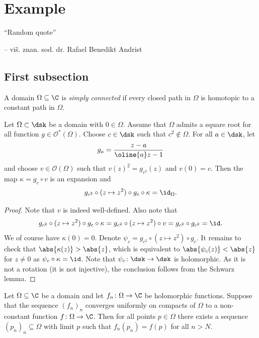 
\section{Example}

\epigraph{``Random quote''}{-- viš. znan. sod. dr. Rafael
Benedikt Andrist}

\subsection{First subsection}


\begin{definicija}
A domain $\Omega \subseteq \C$ is
\emph{simply connected} if every closed
path in $\Omega$ is homotopic to a constant path in $\Omega$.
\end{definicija}



\begin{lema}
Let $\Omega \subset \dsk$ be a domain with $0 \in \Omega$. Assume
that $\Omega$ admits a square root for all function
$g \in \mathcal{O}^*(\Omega)$. Choose $c \in \dsk$ such that
$c^2 \not \in \Omega$. For all $a \in \dsk$, let
\[
g_a = \frac{z - a}{\oline{a} z - 1}
\]
and choose $v \in \mathcal{O}(\Omega)$ such that
$v(z)^2 = g_{c^2}(z)$ and $v(0) = c$. Then the map
$\kappa = g_c \circ v$ is an expansion and
\[
g_{c^2} \circ (z \mapsto z^2) \circ g_c \circ \kappa =
\id_{\Omega}.
\]
\end{lema}

\begin{proof}
Note that $v$ is indeed well-defined. Also note that
\[
g_{c^2} \circ (z \mapsto z^2) \circ g_c \circ \kappa =
g_{c^2} \circ (z \mapsto z^2) \circ v =
g_{c^2} \circ g_{c^2} =
\id.
\]
We of course have $\kappa(0) = 0$. Denote
$\psi_c = g_{c^2} \circ (z \mapsto z^2) \circ g_c$. It remains to
check that $\abs{\kappa(z)} > \abs{z}$, which is equivalent to
$\abs{\psi_c(z)} < \abs{z}$ for $z \ne 0$ as
$\psi_c \circ \kappa = \id$. Note that
$\psi_c \colon \dsk \to \dsk$ is holomorphic. As it is not a
rotation (it is not injective), the conclusion follows from the
Schwarz lemma.
\end{proof}

\begin{lema}[Hurwitz]
Let $\Omega \subseteq \C$ be a domain and let
$f_n \colon \Omega \to \C$ be holomorphic functions. Suppose that
the sequence $(f_n)_n$ converges uniformly on compacts of $\Omega$
to a non-constant function $f \colon \Omega \to \C$. Then for all
points $p \in \Omega$ there exists a sequence
$(p_n)_n \subseteq \Omega$ with limit $p$ such that
$f_n(p_n) = f(p)$ for all $n > N$.
\end{lema}

